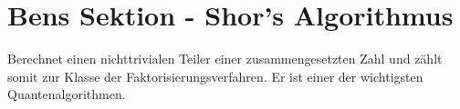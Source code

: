 \section{Bens Sektion -  Shor's Algorithmus}
Berechnet einen nichttrivialen Teiler einer zusammengesetzten Zahl und zählt somit zur Klasse der Faktorisierungsverfahren. Er ist einer der wichtigsten Quantenalgorithmen.\\

 